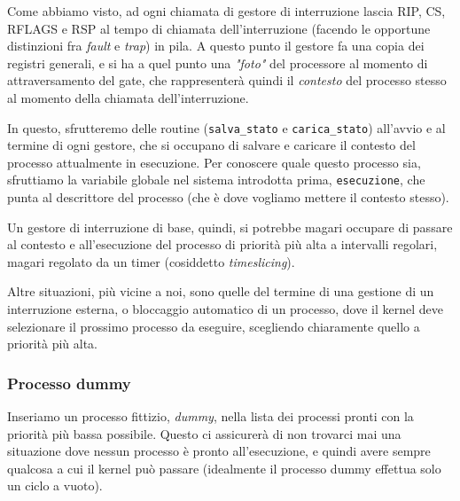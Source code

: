 \documentclass[a4paper,11pt]{article}
\begin{document}
Come abbiamo visto, ad ogni chiamata di gestore di interruzione lascia RIP, CS, RFLAGS e RSP al tempo di chiamata dell'interruzione (facendo le opportune distinzioni fra \textit{fault} e \textit{trap}) in pila.
A questo punto il gestore fa una copia dei registri generali, e si ha a quel punto una \textit{"foto"} del processore al momento di attraversamento del gate, che rappresenterà quindi il \textit{contesto} del processo stesso al momento della chiamata dell'interruzione.

In questo, sfrutteremo delle routine (\lstinline|salva_stato| e \lstinline|carica_stato|) all'avvio e al termine di ogni gestore, che si occupano di salvare e caricare il contesto del processo attualmente in esecuzione.
Per conoscere quale questo processo sia, sfruttiamo la variabile globale nel sistema introdotta prima, \lstinline|esecuzione|, che punta al descrittore del processo (che è dove vogliamo mettere il contesto stesso).

Un gestore di interruzione di base, quindi, si potrebbe magari occupare di passare al contesto e all'esecuzione del processo di priorità più alta a intervalli regolari, magari regolato da un timer (cosiddetto \textit{timeslicing}).

Altre situazioni, più vicine a noi, sono quelle del termine di una gestione di un interruzione esterna, o bloccaggio automatico di un processo, dove il kernel deve selezionare il prossimo processo da eseguire, scegliendo chiaramente quello a priorità più alta.

\subsubsection{Processo dummy}
Inseriamo un processo fittizio, \textit{dummy}, nella lista dei processi pronti con la priorità più bassa possibile.
Questo ci assicurerà di non trovarci mai una situazione dove nessun processo è pronto all'esecuzione, e quindi avere sempre qualcosa a cui il kernel può passare (idealmente il processo dummy effettua solo un ciclo a vuoto).
\end{document}
